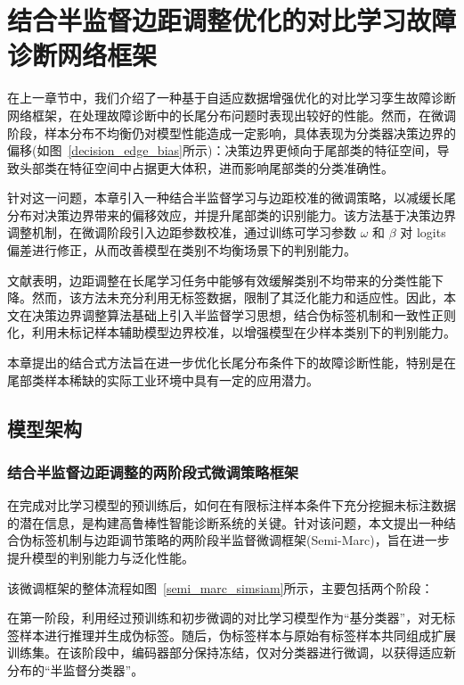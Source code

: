 \documentclass[master]{thesis-uestc}
\begin{document}
\chapter{结合半监督边距调整优化的对比学习故障诊断网络框架}

在上一章节中，我们介绍了一种基于自适应数据增强优化的对比学习孪生故障诊断网络框架，在处理故障诊断中的长尾分布问题时表现出较好的性能。然而，在微调阶段，样本分布不均衡仍对模型性能造成一定影响，具体表现为分类器决策边界的偏移(如图~\ref{decision_edge_bias}所示)：决策边界更倾向于尾部类的特征空间，导致头部类在特征空间中占据更大体积，进而影响尾部类的分类准确性。

针对这一问题，本章引入一种结合半监督学习与边距校准的微调策略，以减缓长尾分布对决策边界带来的偏移效应，并提升尾部类的识别能力。该方法基于决策边界调整机制，在微调阶段引入边距参数校准，通过训练可学习参数 $\omega$ 和 $\beta$ 对 logits 偏差进行修正，从而改善模型在类别不均衡场景下的判别能力。

文献\cite{wang2023margin}表明，边距调整在长尾学习任务中能够有效缓解类别不均带来的分类性能下降。然而，该方法未充分利用无标签数据，限制了其泛化能力和适应性。因此，本文在决策边界调整算法基础上引入半监督学习思想，结合伪标签机制和一致性正则化，利用未标记样本辅助模型边界校准，以增强模型在少样本类别下的判别能力。

本章提出的结合式方法旨在进一步优化长尾分布条件下的故障诊断性能，特别是在尾部类样本稀缺的实际工业环境中具有一定的应用潜力。

\section{模型架构}

\subsection{结合半监督边距调整的两阶段式微调策略框架}

在完成对比学习模型的预训练后，如何在有限标注样本条件下充分挖掘未标注数据的潜在信息，是构建高鲁棒性智能诊断系统的关键。针对该问题，本文提出一种结合伪标签机制与边距调节策略的两阶段半监督微调框架(Semi-Marc)，旨在进一步提升模型的判别能力与泛化性能。

该微调框架的整体流程如图~\ref{semi_marc_simsiam}所示，主要包括两个阶段：

在第一阶段，利用经过预训练和初步微调的对比学习模型作为“基分类器”，对无标签样本进行推理并生成伪标签。随后，伪标签样本与原始有标签样本共同组成扩展训练集。在该阶段中，编码器部分保持冻结，仅对分类器进行微调，以获得适应新分布的“半监督分类器”。
\end{document}
